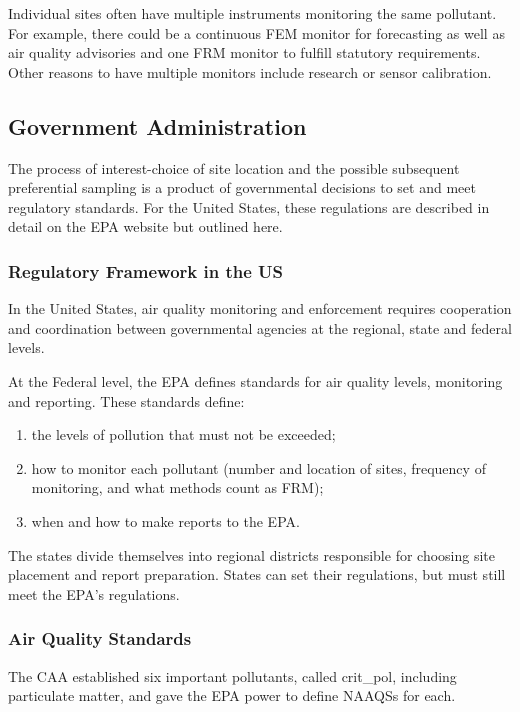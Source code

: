 \documentclass{article}
\begin{document}
	Individual sites often have multiple instruments monitoring the same pollutant. For example, there could be a continuous \ac{FEM} monitor for forecasting as well as air quality advisories and one \ac{FRM} monitor to fulfill statutory requirements.  Other reasons to have multiple monitors include research or sensor calibration. 
	
	
	
	\subsection{Government Administration}
	\label{subsec:govtadmin}
	The process of interest-choice of site location and the possible subsequent preferential sampling is a product of governmental decisions to set and meet regulatory standards.  For the United States, these regulations are described in detail on the EPA website
	but outlined here.
	
	\subsubsection*{Regulatory Framework in the US}
	\label{subsubsec:regulation}
	In the United States, air quality monitoring and enforcement requires cooperation and coordination between governmental agencies at the regional, state and federal levels.
	
	At the Federal level, the \ac{EPA} defines standards for air quality levels, monitoring and reporting.   These standards define:
	\begin{enumerate}
		\item the levels of pollution that must not be exceeded;
		\item how to monitor each pollutant (number and location of sites, frequency of monitoring, and what methods count as \ac{FRM});
		\item when and how to make reports to the \ac{EPA}.
	\end{enumerate}
	
	The states divide themselves into regional districts responsible for choosing site placement and report preparation.  States can set their regulations, but must still meet the \ac{EPA}'s regulations. 
	
	\subsubsection*{Air Quality Standards}\label{subsubsec:aqs}
	The \ac{CAA} established six important pollutants, called \gls{crit_pol}, 
	including particulate matter, and gave the \ac{EPA} power to define \acp{NAAQS} for each.
	
\end{document}
